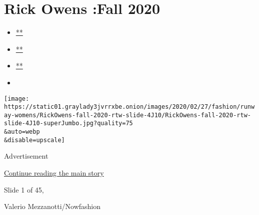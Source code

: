 \hypertarget{rick-owens-fall-2020}{%
\section{Rick Owens :Fall 2020}\label{rick-owens-fall-2020}}

\begin{itemize}
\item
  \href{https://www.facebookcorewwwi.onion/sharer.php?app_id=9869919170\&u=https\%3A\%2F\%2Fwww.nytimes3xbfgragh.onion\%2Fslideshow\%2F2020\%2F02\%2F27\%2Ffashion\%2Frunway-womens\%2Frick-owens-fall-2020.html\%3Fsmid\%3Dfb-share\&name=Rick\%20Owens\%20\%3AFall\%202020\&redirect_uri=https\%3A\%2F\%2Fwww.facebookcorewwwi.onion\%2F}{**}
\item
  \href{https://twitter.com/intent/tweet?url=https\%3A\%2F\%2Fwww.nytimes3xbfgragh.onion\%2Fslideshow\%2F2020\%2F02\%2F27\%2Ffashion\%2Frunway-womens\%2Frick-owens-fall-2020.html\%3Fsmid\%3Dtw-share\&text=Rick\%20Owens\%20\%3AFall\%202020}{**}
\item
  \href{mailto:?subject=nytimes3xbfgragh.onion\%3A\%20Rick\%20Owens\%20\%3AFall\%202020\&body=From\%20The\%20New\%20York\%20Times\%3A\%0A\%0ARick\%20Owens\%20\%3AFall\%202020\%0A\%0ASee\%20the\%20looks\%20from\%20the\%20Rick\%20Owens\%3A\%20Fall\%202020\%20Collection.\%0A\%0Ahttps\%3A\%2F\%2Fwww.nytimes3xbfgragh.onion\%2Fslideshow\%2F2020\%2F02\%2F27\%2Ffashion\%2Frunway-womens\%2Frick-owens-fall-2020.html\%3Fsmid\%3Dem-share}{**}
\item
\end{itemize}

\texttt{[image: https://static01.graylady3jvrrxbe.onion/images/2020/02/27/fashion/runway-womens/RickOwens-fall-2020-rtw-slide-4J10/RickOwens-fall-2020-rtw-slide-4J10-superJumbo.jpg?quality=75\\\&auto=webp\\\&disable=upscale]}

Advertisement

\protect\hyperlink{after-right-0}{Continue reading the main story}

Slide 1 of 45,

Valerio Mezzanotti/Nowfashion

